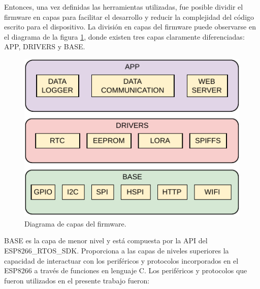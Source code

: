 Entonces, una vez definidas las herramientas utilizadas, fue posible dividir el firmware en capas para facilitar el desarrollo y reducir la complejidad del código escrito para el dispositivo. La división en capas del firmware puede observarse en el diagrama de la figura \ref{fig:firmwareLayers}, donde existen tres capas claramente diferenciadas: APP, DRIVERS y BASE.

\begin{figure}[h]
	\centering
	\includegraphics[scale=1]{./Figures/firmware_layers.pdf}
	\caption{Diagrama de capas del firmware.}
		\label{fig:firmwareLayers}
\end{figure}

BASE es la capa de menor nivel y está compuesta por la API del ESP8266\_RTOS\_SDK. Proporciona a las capas de niveles superiores la capacidad de interactuar con los periféricos y protocolos incorporados en el ESP8266 a través de funciones en lenguaje C. Los periféricos y protocolos que fueron utilizados en el presente trabajo fueron:

